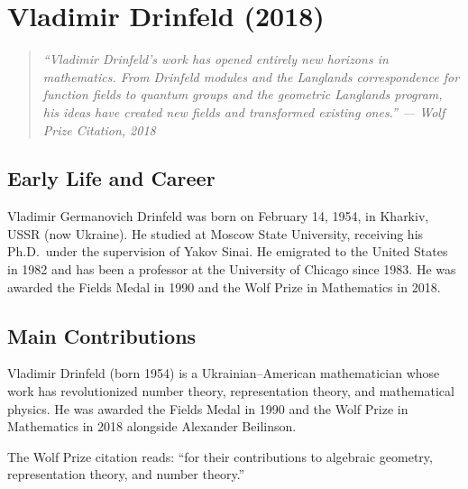 
\chapter{Vladimir Drinfeld (2018)}

\begin{quote}
\it ``Vladimir Drinfeld's work has opened entirely new horizons in mathematics. From Drinfeld modules and the Langlands correspondence for function fields to quantum groups and the geometric Langlands program, his ideas have created new fields and transformed existing ones.'' --- Wolf Prize Citation, 2018
\end{quote}

\section{Early Life and Career}

Vladimir Germanovich Drinfeld was born on February 14, 1954, in Kharkiv, USSR (now Ukraine). He studied at Moscow State University, receiving his Ph.D.\ under the supervision of Yakov Sinai. He emigrated to the United States in 1982 and has been a professor at the University of Chicago since 1983. He was awarded the Fields Medal in 1990 and the Wolf Prize in Mathematics in 2018.

\section{Main Contributions}

Vladimir Drinfeld (born 1954) is a Ukrainian--American mathematician whose work has revolutionized number theory, representation theory, and mathematical physics. He was awarded the Fields Medal in 1990 and the Wolf Prize in Mathematics in 2018 alongside Alexander Beilinson.

The Wolf Prize citation reads: ``for their contributions to algebraic geometry, representation theory, and number theory.''

